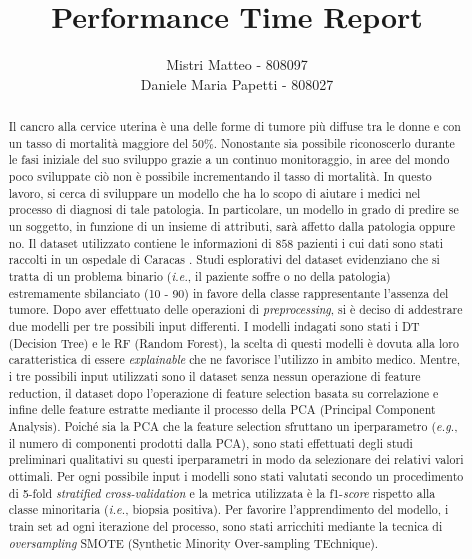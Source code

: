 \documentclass[a4paper, 12pt, conference]{ieeeconf}
\title{\LARGE \bf
Performance Time Report
}
\author{Mistri Matteo - 808097\\
	Daniele Maria Papetti - 808027
}
\begin{document}
\maketitle
\thispagestyle{empty}
\pagestyle{empty}

\begin{abstract}

Il cancro alla cervice uterina è una delle forme di tumore più diffuse tra le donne e con un tasso di mortalità maggiore del $50\%$.
Nonostante sia possibile riconoscerlo durante le fasi iniziale del suo sviluppo grazie a un continuo monitoraggio, in aree del mondo poco sviluppate ciò non è possibile incrementando il tasso di mortalità.
In questo lavoro, si cerca di sviluppare un modello che ha lo scopo di aiutare i medici nel processo di diagnosi di tale patologia. 
In particolare, un modello in grado di predire se un soggetto, in funzione di un insieme di attributi, sarà affetto dalla patologia oppure no.
Il dataset utilizzato contiene le informazioni di $858$ pazienti i cui dati sono stati raccolti in un ospedale di Caracas \cite{ML}.
Studi esplorativi del dataset evidenziano che si tratta di un problema binario (\textit{i.e.}, il paziente soffre o no della patologia) estremamente sbilanciato (10 - 90) in favore della classe rappresentante l'assenza del tumore.
Dopo aver effettuato delle operazioni di \textit{preprocessing}, si è deciso di addestrare due modelli per tre possibili input differenti.
I modelli indagati sono stati i DT (Decision Tree) e le RF (Random Forest), la scelta di questi modelli è dovuta alla loro caratteristica di essere \textit{explainable} che ne favorisce l'utilizzo in ambito medico.
Mentre, i tre possibili input utilizzati sono il dataset senza nessun operazione di feature reduction, il dataset dopo l'operazione di feature selection basata su correlazione e infine delle feature estratte mediante il processo della PCA (Principal Component Analysis).
Poiché sia la PCA che la feature selection sfruttano un iperparametro (\textit{e.g.}, il numero di componenti prodotti dalla PCA), sono stati effettuati degli studi preliminari qualitativi su questi iperparametri in modo da selezionare dei relativi valori ottimali.
Per ogni possibile input i modelli sono stati valutati secondo un procedimento di 5-fold \textit{stratified cross-validation} e la metrica utilizzata è la f1-\textit{score} rispetto alla classe minoritaria (\textit{i.e.}, biopsia positiva).
Per favorire l'apprendimento del modello, i train set ad ogni iterazione del processo, sono stati arricchiti mediante la tecnica di \textit{oversampling} SMOTE (Synthetic Minority Over-sampling TEchnique).

\end{abstract}
\end{document}
